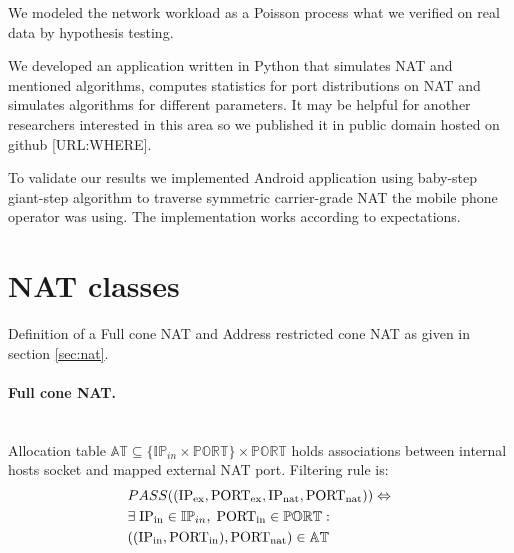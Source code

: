 \documentclass[twoside]{article}
\begin{document}
\begin{multicols}{2}
We modeled the network workload as a Poisson process what we verified on real data by hypothesis testing.

We developed an application written in Python that simulates NAT and mentioned algorithms, computes
statistics for port distributions on NAT and simulates algorithms for different parameters. It
may be helpful for another researchers interested in this area so we published it in public domain
hosted on github [URL:WHERE].

To validate our results we implemented Android application using baby-step giant-step algorithm
to traverse symmetric carrier-grade NAT the mobile phone operator was using. The implementation
works according to expectations.

\appendix
\section{NAT classes}\label{sec:classes_appendix}
Definition of a Full cone NAT and Address restricted cone NAT as given in section \ref{sec:nat}.

\paragraph{Full cone NAT.} ~\\
Allocation table $\mathbb{AT} \subseteq \{ \mathbb{IP}_{in} \times \mathbb{PORT} \} \times \mathbb{PORT}$ holds associations between internal 
hosts socket and mapped external NAT port. 
Filtering rule is:
\begin{align*}
& PASS((\text{IP\textsubscript{ex}}, \text{PORT\textsubscript{ex}}, \text{IP\textsubscript{nat}}, \text{PORT\textsubscript{nat}} )) \Leftrightarrow \\
&  \exists \; \text{IP\textsubscript{in}} \in \mathbb{IP}_{in}, \; \text{PORT\textsubscript{in}} \in \mathbb{PORT}:\\
& ((\text{IP\textsubscript{in}}, \text{PORT\textsubscript{in}}), \text{PORT\textsubscript{nat}} ) \in \mathbb{AT}
\end{align*}
 

\end{multicols}
\end{document}
